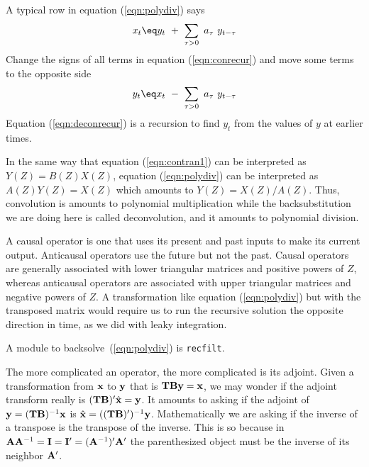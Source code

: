 \par
A typical row in equation (\ref{eqn:polydiv}) says
\begin{equation}
x_t \eq y_t \ +\ \sum_{\tau > 0} \ a_\tau\ y_{t-\tau}
\label{eqn:conrecur}
\end{equation}
Change the signs of all terms in equation
(\ref{eqn:conrecur})
and
move some terms to the opposite side
\begin{equation}
y_t \eq x_t \ -\ \sum_{\tau > 0} \ a_\tau\ y_{t-\tau}
\label{eqn:deconrecur}
\end{equation}
Equation (\ref{eqn:deconrecur}) is a recursion
to find $y_t$ from the values of $y$ at earlier times.

\par
In the same way that
equation (\ref{eqn:contran1})
can be interpreted as $Y(Z)=B(Z)X(Z)$,
equation (\ref{eqn:polydiv})
can be interpreted as $A(Z) Y(Z) = X(Z)$
which amounts to
$Y(Z) = X(Z)/A(Z)$.
Thus, convolution is amounts to polynomial multiplication
while the backsubstitution we are doing here
is called deconvolution, and it amounts to polynomial division.




\par
A causal operator is one that uses its present and past inputs
to make its current output.
Anticausal operators use the future but not the past.
Causal operators are generally associated with lower triangular matrices
and positive powers of $Z$, whereas
anticausal operators are associated with upper triangular matrices
and negative powers of $Z$.
A transformation like equation
(\ref{eqn:polydiv})
but with the transposed matrix would require us
to run the recursive solution the opposite direction in time,
as we did with leaky integration.


\par
A module to backsolve~(\ref{eqn:polydiv}) is \texttt{recfilt}.

\par
The more complicated an operator, the more complicated is its adjoint.
Given a transformation from $\bold x$ to $\bold y$ that is
$\bold T\bold B \bold y = \bold x$,
we may wonder if the adjoint transform really is
$(\bold T\bold B)' \hat{\bold x}= \bold y$.
It amounts to asking if the adjoint of
$\bold y = (\bold T\bold B)^{-1}\bold x$ is
$\hat{\bold x} = ((\bold T\bold B)')^{-1}\bold y$.
Mathematically we are asking if
the inverse of a transpose is the transpose of the inverse.
This is so because in
$\bold A\bold A^{-1} = \bold I = \bold I' = (\bold A^{-1})'\bold A'$
the parenthesized object must be the inverse of its neighbor $\bold A'$.



